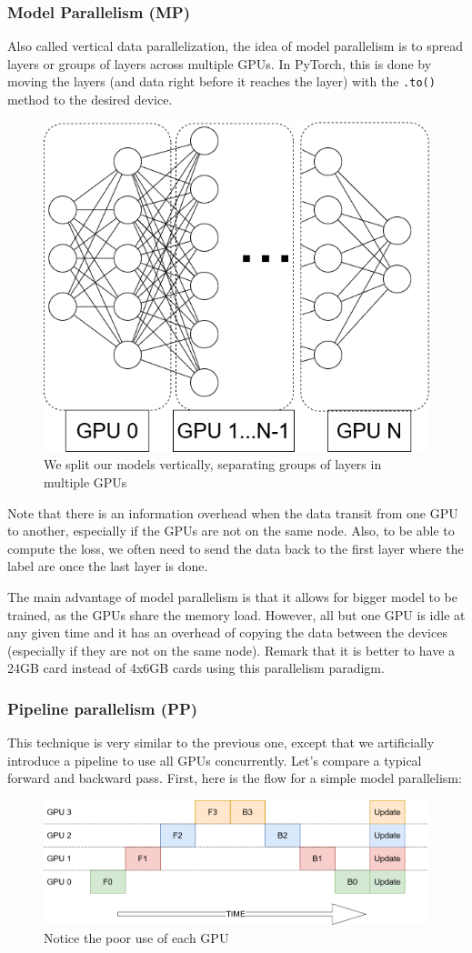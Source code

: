 \documentclass{article}
\begin{document}
\subsubsection{Model Parallelism (MP)}
Also called vertical data parallelization, the idea of model parallelism is to spread layers or groups of layers across multiple GPUs. In PyTorch, this is done by moving the layers (and data right before it reaches the layer) with the \lstinline{.to()} method to the desired device.
\begin{figure}[h!]
  \center
  \includegraphics[width=0.5\linewidth]{images/2022-08-24-18-23-26.png}
  \caption{We split our models vertically, separating groups of layers in multiple GPUs}
\end{figure}
\FloatBarrier
Note that there is an information overhead when the data transit from one GPU to another, especially if the GPUs are not on the same node. Also, to be able to compute the loss, we often need to send the data back to the first layer where the label are once the last layer is done.

The main advantage of model parallelism is that it allows for bigger model to be trained, as the GPUs share the memory load. However, all but one GPU is idle at any given time and it has an overhead of copying the data between the devices (especially if they are not on the same node). Remark that it is better to have a 24GB card instead of 4x6GB cards using this parallelism paradigm.

\subsubsection{Pipeline parallelism (PP)}
This technique is very similar to the previous one, except that we artificially introduce a pipeline to use all GPUs concurrently. Let's compare a typical forward and backward pass. First, here is the flow for a simple model parallelism:

\begin{figure}[h!]
  \center
  \includegraphics[width=0.7\linewidth]{images/2022-08-25-09-22-17.png}
  \caption{Notice the poor use of each GPU}
\end{figure}
\FloatBarrier
\end{document}
